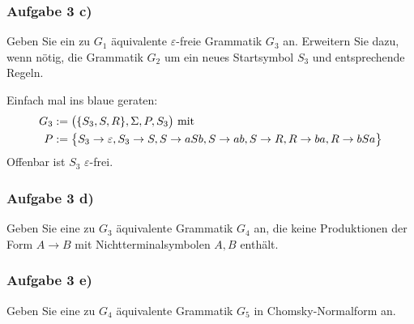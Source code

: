 \subsubsection{Aufgabe 3 c)}
Geben Sie ein zu $G_1$ äquivalente $\varepsilon$-freie Grammatik $G_3$ an.
Erweitern Sie dazu, wenn nötig, die Grammatik $G_2$ um ein neues Startsymbol $S_3$ und entsprechende Regeln.

\begin{lösung}
	Einfach mal ins blaue geraten:
	\begin{align*}
		G_3&:=\big(\lbrace S_3,S,R\rbrace,\Sigma,P,S_3\big)\mit\\
		P&:=\big\lbrace
			S_3\to\varepsilon, S_3\to S, S\to aSb, S\to ab, S\to R,R\to ba,R\to bSa
		\big\rbrace
	\end{align*}
	Offenbar ist $S_3$ $\varepsilon$-frei.
\end{lösung}

\subsubsection{Aufgabe 3 d)}
Geben Sie eine zu $G_3$ äquivalente Grammatik $G_4$ an, die keine Produktionen der Form $A\to B$ mit Nichtterminalsymbolen $A,B$ enthält.

\begin{lösung}
\end{lösung}

\subsubsection{Aufgabe 3 e)}
Geben Sie eine zu $G_4$ äquivalente Grammatik $G_5$ in Chomsky-Normalform an.

\begin{lösung}
\end{lösung}